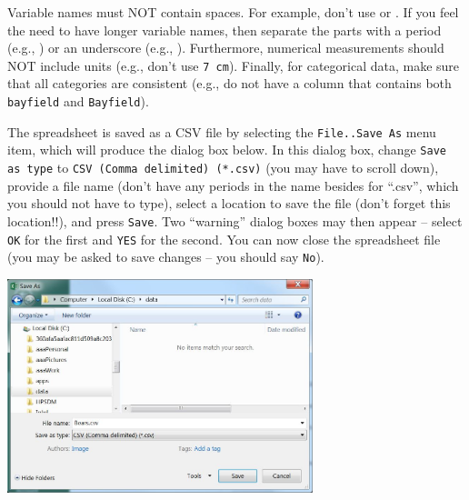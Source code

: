 \documentclass[10pt,openany]{book}\usepackage[]{graphicx}\usepackage[]{color}
\begin{document}

\vspace{-12pt}

Variable names must NOT contain spaces.  For example, don't use  or .  If you feel the need to have longer variable names, then separate the parts with a period (e.g., ) or an underscore (e.g., ).  Furthermore, numerical measurements should NOT include units (e.g., don't use \verb"7 cm").  Finally, for categorical data, make sure that all categories are consistent (e.g., do not have a column that contains both \verb"bayfield" and \verb"Bayfield").


The spreadsheet is saved as a CSV file by selecting the \verb"File..Save As" menu item, which will produce the dialog box below. In this dialog box, change \verb"Save as type" to \verb"CSV (Comma delimited) (*.csv)" (you may have to scroll down), provide a file name (don't have any periods in the name besides for ``.csv'', which you should not have to type), select a location to save the file (don't forget this location!!), and press \verb"Save".  Two ``warning'' dialog boxes may then appear -- select \verb"OK" for the first and \verb"YES" for the second.  You can now close the spreadsheet file (you may be asked to save changes -- you should say \verb"No").
\begin{center}
  \includegraphics[width=3.5in]{Figs/Data_File_2.jpg}
\end{center}
\end{document}
